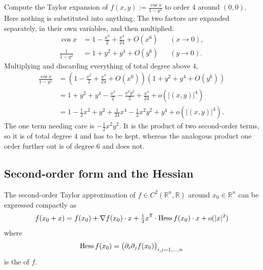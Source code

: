 \begin{example}
\label{ex:taylor_expansion_cos_over_1_minus_y2}
Compute the Taylor expansion of $f(x,y) := \frac{\cos x}{1-y^2}$ to order $4$ around $(0,0)$.
Here nothing is substituted into anything. The two factors are expanded separately, in their own
variables, and then multiplied:
\begin{align*}
\cos x &= 1 - \frac{x^2}{2} + \frac{x^4}{24} + O(x^6) && (x \to 0), \\
\frac{1}{1-y^2} &= 1 + y^2 + y^4 + O(y^6) && (y \to 0).
\end{align*}
Multiplying and discarding everything of total degree above $4$,
\begin{align*}
\frac{\cos x}{1-y^2} &= \left(1 - \frac{x^2}{2} + \frac{x^4}{24} + O(x^6)\right)\left(1 + y^2 + y^4 + O(y^6)\right) \\
&= 1 + y^2 + y^4 - \frac{x^2}{2} - \frac{x^2y^2}{2} + \frac{x^4}{24} + o(|(x,y)|^4) \\
&= 1 - \frac{1}{2}x^2 + y^2 + \frac{1}{24}x^4 - \frac{1}{2}x^2y^2 + y^4 + o(|(x,y)|^4).
\end{align*}
The one term needing care is $-\tfrac12x^2y^2$. It is the product of two second-order terms, so it
is of total degree $4$ and has to be kept, whereas the analogous product one order further out is
of degree $6$ and does not.
\end{example}

\subsection{Second-order form and the Hessian}

\begin{remark}
\label{rem:second_order_taylor_hessian}
The second-order Taylor approximation of $f \in C^2(\mathbb{R}^n,\mathbb{R})$ around
$x_0 \in \mathbb{R}^n$ can be expressed compactly as
\[f(x_0+x) = f(x_0) + \nabla f(x_0)\cdot x + \tfrac{1}{2}x^{\mathsf{T}} \cdot \operatorname{Hess} f(x_0)\cdot x + o(|x|^2)\]
where
\[\operatorname{Hess} f(x_0) = \big(\partial_i\partial_j f(x_0)\big)_{i,j=1,\dots,n}\]
is the   of $f$.
\end{remark}


